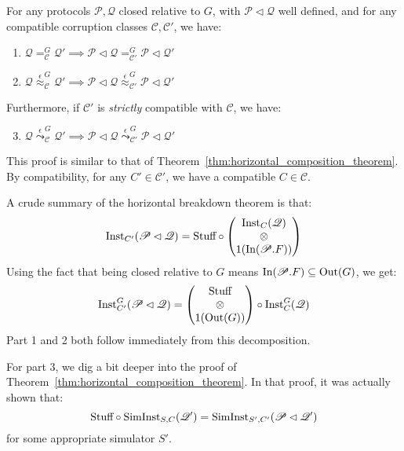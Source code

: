 \begin{theorem}
  For any protocols $\mathscr{P}, \mathscr{Q}$ closed relative to $G$, with $\mathscr{P} \lhd \mathscr{Q}$
  well defined, and for any compatible corruption classes $\mathscr{C}, \mathscr{C'}$, we have:
  \begin{enumerate}
    \item $\mathscr{Q} =^G_{\mathscr{C}} \mathscr{Q}' \implies \mathscr{P} \lhd \mathscr{Q} =^G_{\mathscr{C}'} \mathscr{P} \lhd \mathscr{Q}'$
    \item $\mathscr{Q} \overset{\epsilon}{\approx}^G_{\mathscr{C}} \mathscr{Q}' \implies \mathscr{P} \lhd \mathscr{Q} \overset{\epsilon}{\approx}^G_{\mathscr{C}'} \mathscr{P} \lhd \mathscr{Q}'$
  \end{enumerate}

  Furthermore, if $\mathscr{C}'$ is \emph{strictly} compatible with $\mathscr{C}$,
  we have:
  \begin{enumerate}
    \setcounter{enumi}{2}
    \item $\mathscr{Q} \overset{\epsilon}{\leadsto}^G_{\mathscr{C}} \mathscr{Q}' \implies \mathscr{P} \lhd \mathscr{Q} \overset{\epsilon}{\leadsto}^G_{\mathscr{C}'} \mathscr{P} \lhd \mathscr{Q}'$
  \end{enumerate}

   This proof is similar to that of Theorem~\ref{thm:horizontal_composition_theorem}.
  By compatibility, for any $C' \in \mathscr{C}'$, we have a compatible $C \in \mathscr{C}$.

  A crude summary of the horizontal breakdown theorem is that:
  $$
  \text{Inst}_{C'}(\mathscr{P} \lhd \mathscr{Q})
  = \text{Stuff} \circ \begin{pmatrix}
    \text{Inst}_C(\mathscr{Q})\cr
    \otimes\cr
    1(\text{In}(\mathscr{P}.F))
  \end{pmatrix}
  $$
  Using the fact that being closed relative to $G$ means $\text{In}(\mathscr{P}.F) \subseteq \text{Out}(G)$,
  we get:
  $$
  \text{Inst}^G_{C'}(\mathscr{P} \lhd \mathscr{Q}) =
  \begin{pmatrix}
    \text{Stuff}\cr
    \otimes\cr
    1(\text{Out}(G))
  \end{pmatrix}
  \circ \text{Inst}^G_C(\mathscr{Q})
  $$
  Part 1 and 2 both follow immediately from this decomposition.

  For part 3, we dig a bit deeper into the proof of Theorem~\ref{thm:horizontal_composition_theorem}.
  In that proof, it was actually shown that:
  $$
  \text{Stuff} \circ \text{SimInst}_{S, C}(\mathscr{Q}') = \text{SimInst}_{S', C'}(\mathscr{P} \lhd \mathscr{Q}')
  $$
  for some appropriate simulator $S'$.


\end{theorem}
